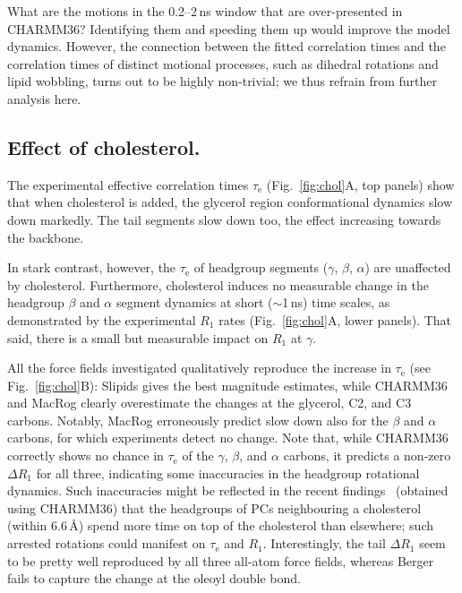 \documentclass[journal=jpcbfk,manuscript=article,layout=twocolumn]{achemso}
\begin{document}
What are the motions in the 0.2--2\,ns window that are over-presented in CHARMM36?
Identifying them and speeding them up would improve the model dynamics.
However, the connection between the fitted correlation times and the correlation times of distinct motional processes, such as dihedral rotations and lipid wobbling, turns out to be highly non-trivial; we thus refrain from further analysis here.

\subsection*{Effect of cholesterol.}
The experimental effective correlation times $\tau_\mathrm e$
(Fig.~\ref{fig:chol}A, top panels)
show that when cholesterol is added,
the glycerol region conformational dynamics
slow down markedly.
%
The tail segments slow down too,
the effect increasing towards the backbone.

In stark contrast, however,
the $\tau_\mathrm e$ of headgroup segments ($\gamma$, $\beta$, $\alpha$)
are unaffected by cholesterol.
%
Furthermore, cholesterol induces no measurable change in the
headgroup $\beta$ and $\alpha$ segment
dynamics at short ($\sim$1\,ns) time scales, as
demonstrated by
the experimental $R_{1}$ rates (Fig.~\ref{fig:chol}A, lower panels).
That said,
there is a small but measurable impact on $R_1$ at $\gamma$.

All the force fields investigated qualitatively reproduce the increase in $\tau_\mathrm e$ (see Fig.~\ref{fig:chol}B):
Slipids gives the best magnitude estimates, while CHARMM36 and MacRog clearly overestimate the changes at the glycerol, C2, and C3 carbons. Notably, MacRog  erroneously predict slow down also for the $\beta$ and $\alpha$ carbons, for which experiments detect no change.
%
Note that,  while CHARMM36 correctly shows no chance in $\tau_\mathrm{e}$
of the $\gamma$, $\beta$, and $\alpha$ carbons,
it predicts a non-zero $\Delta R_{1}$ for all three, indicating some inaccuracies in the
headgroup rotational dynamics. %
Such inaccuracies might be reflected in the recent findings~\cite{leeb18}
(obtained using CHARMM36)
that 
the headgroups of PCs neighbouring a cholesterol (within 6.6\,\AA) spend more time on top of the cholesterol than elsewhere;
such arrested rotations could manifest on $\tau_\mathrm e$ and $R_1$.
%
Interestingly, 
the tail $\Delta R_{1}$ seem to be pretty well reproduced by
all three all-atom force fields, whereas Berger fails to capture the change at the oleoyl double bond.
\end{document}
